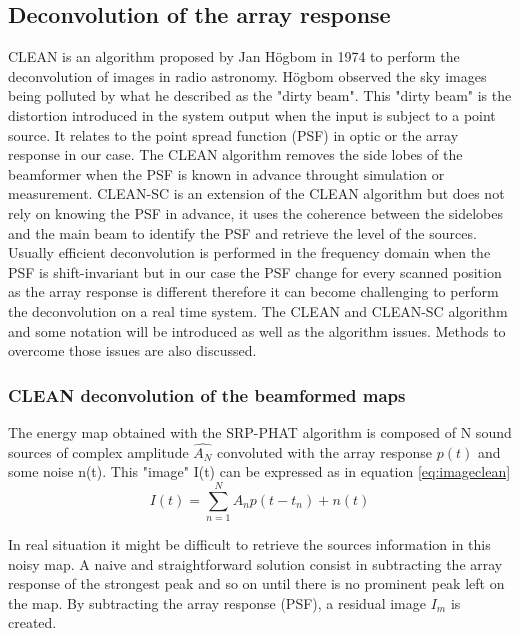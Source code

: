 \subsection{Deconvolution of the array response}

CLEAN is an algorithm proposed by Jan Högbom in 1974 \cite{1974A&AS...15..417H} to perform the deconvolution of images in radio astronomy. Högbom observed the sky images being polluted by what he described as the "dirty beam". This "dirty beam" is the distortion introduced in the system output when the input is subject to a point source. It relates to the point spread function (PSF) in optic or the array response in our case. The CLEAN algorithm removes the side lobes of the beamformer when the PSF is known in advance throught simulation or measurement. CLEAN-SC is an extension of the CLEAN algorithm but does not rely on knowing the PSF in advance, it uses the coherence between the sidelobes and the main beam to identify the PSF and retrieve the level of the sources. Usually efficient deconvolution is performed in the frequency domain when the PSF is shift-invariant but in our case the PSF change for every scanned position as the array response is different therefore it can become challenging to perform the deconvolution on a real time system. The CLEAN and CLEAN-SC algorithm and some notation will be introduced as well as the algorithm issues. Methods to overcome those issues are also discussed.

\subsubsection{CLEAN deconvolution of the beamformed maps}

The energy map obtained with the SRP-PHAT algorithm is composed of N sound sources of complex amplitude $\hat{A_{N}}$ convoluted with the array response $p(t)$ and some noise n(t). This "image" I(t) can be expressed as in equation \ref{eq:imageclean}
\begin{equation}
    I(t)=\sum\limits_{n=1}^{N}{A_{n}p(t-t_{n})+n(t)}
    \label{eq:imageclean}
\end{equation}

In real situation it might be difficult to retrieve the sources information in this noisy map. A naive and straightforward solution consist in subtracting the array response of the strongest peak and so on until there is no prominent peak left on the map. By subtracting the array response (PSF), a residual image $I_{m}$ is created.

